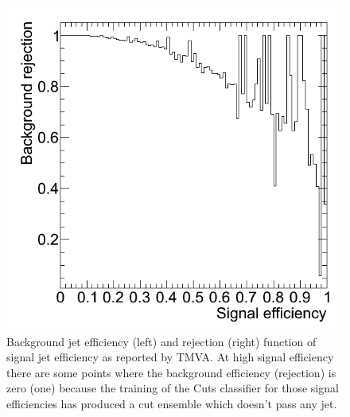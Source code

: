 \begin{figure}[h]
\begin{center}
\begin{minipage}{.3\textwidth}
      \includegraphics[width=\textwidth]{images/mk_cuts-tmva-rejBvsS}
    \end{minipage}
  \end{center}
  \caption{Background jet efficiency (left) and rejection (right)
    function of signal jet efficiency as reported by TMVA. At high
    signal efficiency there are some points where the background
    efficiency (rejection) is zero (one) because the training of the
    Cuts classifier for those signal efficiencies has produced a cut
    ensemble which doesn't pass any jet.}
  \label{fig:mkCutsTmva}
\end{figure}

